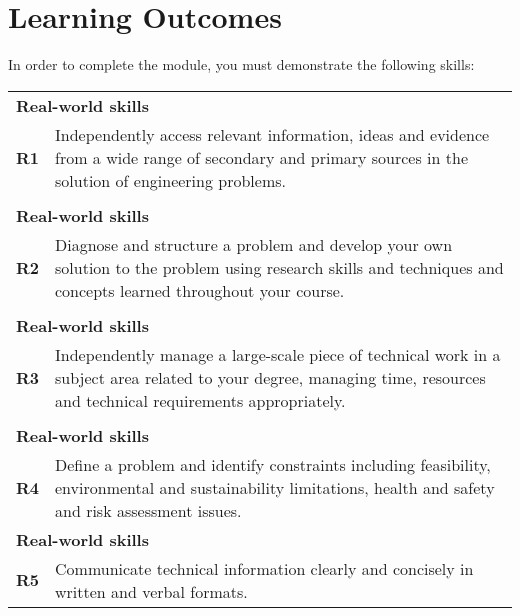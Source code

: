 \chapter{Learning Outcomes}

In order to complete the module, you must demonstrate the following skills:
\vspace{3mm} 

\begin{table}[h]
    \centering
    \begin{tabularx}{340pt}{lllll}
    \multicolumn{5}{X}{\textbf{Real-world skills}}       \\
    \textbf{R1}          & \multicolumn{4}{X}{Independently access relevant information, ideas and evidence from a wide range of secondary and primary sources in the solution of engineering problems.}                \\
    
    \vspace{3mm} \\
    \multicolumn{5}{X}{\textbf{Real-world skills}}                  \\
    \textbf{R2}          & \multicolumn{4}{X}{Diagnose and structure a problem and develop your own solution to the problem using research skills and techniques and concepts learned throughout your course.}            \\
    
    \vspace{3mm} \\
    \multicolumn{5}{X}{\textbf{Real-world skills}} \\
    \textbf{R3}          & \multicolumn{4}{X}{Independently manage a large-scale piece of technical work in a subject area related to your degree, managing time, resources and technical requirements appropriately.}         \\
    
    \vspace{3mm} \\
    \multicolumn{5}{X}{\textbf{Real-world skills}}      \\
    \textbf{R4}          & \multicolumn{4}{X}{Define a problem and identify constraints including feasibility, environmental and sustainability limitations, health and safety and risk assessment issues.}  
    
    \vspace{3mm} \\
    \multicolumn{5}{X}{\textbf{Real-world skills}}      \\
    \textbf{R5}          & \multicolumn{4}{X}{Communicate technical information clearly and concisely in written and verbal formats.} 
    
    \end{tabularx}
\end{table}
